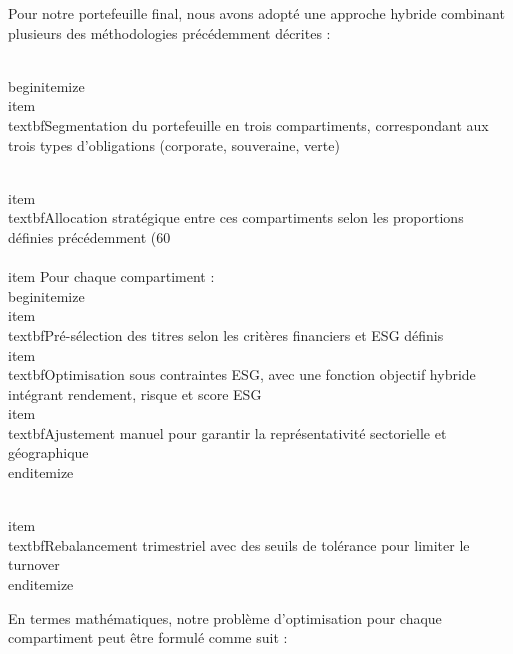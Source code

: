 Pour notre portefeuille final, nous avons adopté une approche hybride combinant plusieurs des méthodologies précédemment décrites :

\\begin{itemize}
    \\item \\textbf{Segmentation} du portefeuille en trois compartiments, correspondant aux trois types d'obligations (corporate, souveraine, verte)
    
    \\item \\textbf{Allocation stratégique} entre ces compartiments selon les proportions définies précédemment (60\\%
    
    \\item Pour chaque compartiment :
    \\begin{itemize}
        \\item \\textbf{Pré-sélection} des titres selon les critères financiers et ESG définis
        \\item \\textbf{Optimisation sous contraintes ESG}, avec une fonction objectif hybride intégrant rendement, risque et score ESG
        \\item \\textbf{Ajustement manuel} pour garantir la représentativité sectorielle et géographique
    \\end{itemize}
    
    \\item \\textbf{Rebalancement trimestriel} avec des seuils de tolérance pour limiter le turnover
\\end{itemize}

En termes mathématiques, notre problème d'optimisation pour chaque compartiment peut être formulé comme suit :

